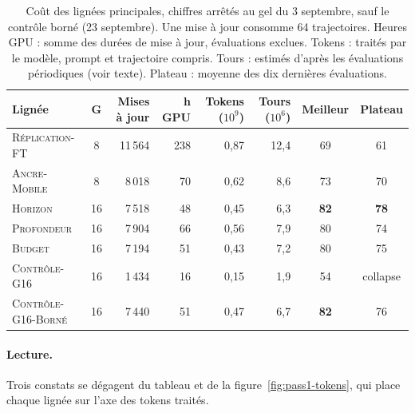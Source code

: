 \documentclass[11pt,a4paper]{article}
\begin{document}
\begin{table}[htbp]
\centering
\caption{Coût des lignées principales, chiffres arrêtés au gel du 3 septembre, sauf le contrôle borné (23 septembre). Une mise à jour consomme 64 trajectoires. Heures GPU : somme des durées de mise à jour, évaluations exclues. Tokens : traités par le modèle, prompt et trajectoire compris. Tours : estimés d'après les évaluations périodiques (voir texte). Plateau : moyenne des dix dernières évaluations.}
\label{tab:compute}
\footnotesize
\setlength{\tabcolsep}{4pt}
\begin{tabular}{l c r r r r c c}
\toprule
\textbf{Lignée} & $\boldsymbol{G}$ & \textbf{Mises à jour} & \textbf{h GPU} & \textbf{Tokens ($10^9$)} & \textbf{Tours ($10^6$)} & \textbf{Meilleur} & \textbf{Plateau} \\
\midrule
\textsc{Réplication-FT} & 8 & 11\,564 & 238 & 0{,}87 & 12{,}4 & 69 & 61 \\
\textsc{Ancre-Mobile} & 8 & 8\,018 & 70 & 0{,}62 & 8{,}6 & 73 & 70 \\
\textsc{Horizon} & 16 & 7\,518 & 48 & 0{,}45 & 6{,}3 & \textbf{82} & \textbf{78} \\
\textsc{Profondeur} & 16 & 7\,904 & 66 & 0{,}56 & 7{,}9 & 80 & 74 \\
\textsc{Budget} & 16 & 7\,194 & 51 & 0{,}43 & 7{,}2 & 80 & 75 \\
\textsc{Contrôle-G16} & 16 & 1\,434 & 16 & 0{,}15 & 1{,}9 & 54 & collapse \\
\textsc{Contrôle-G16-Borné} & 16 & 7\,440 & 51 & 0{,}47 & 6{,}7 & \textbf{82} & 76 \\
\bottomrule
\end{tabular}
\end{table}

\paragraph{Lecture.} Trois constats se dégagent du tableau et de la figure~\ref{fig:pass1-tokens}, qui place chaque lignée sur l'axe des tokens traités.
\end{document}
